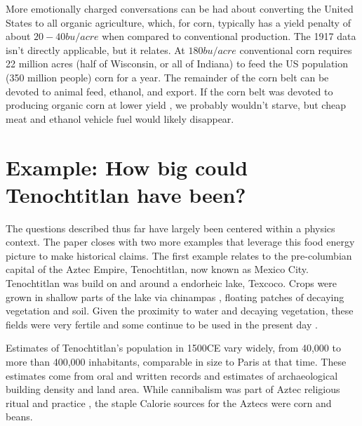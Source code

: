 \documentclass[12pt]{iopart}
\begin{document}
%
%
More emotionally charged conversations can be had about converting the United States to all organic agriculture, which, for corn, typically has a yield penalty of about $20-40bu/acre$ when compared to conventional production.  The 1917 data isn't directly applicable, but it relates. At $180bu/acre$ conventional corn requires 22 million acres (half of Wisconsin, or all of Indiana) to feed the US population (350 million people) corn for a year.  The remainder of the corn belt can be devoted to animal feed, ethanol, and export.  If the corn belt was devoted to producing organic corn at lower yield \cite{organic_corn_yield}, we probably wouldn't starve, but cheap meat and ethanol vehicle fuel would likely disappear.   
%

\section{Example: How big could Tenochtitlan have been?}
The questions described thus far have largely been centered within a physics context.  The paper closes with two more examples that leverage this food energy picture to make historical claims.  The first example relates to the pre-columbian capital of the Aztec Empire, Tenochtitlan, now known as Mexico City.  Tenochtitlan was build on and around a endorheic lake, Texcoco.  Crops were grown in shallow parts of the lake via chinampas \cite{national_geo}, floating patches of decaying vegetation and soil.  Given the proximity to water and decaying vegetation, these fields were very fertile \cite{HortTech_2019,Chinampas_1964} and some continue to be used in the present day \cite{google_earth}.  


Estimates of Tenochtitlan's population in 1500CE vary widely, from 40,000 \cite{40k} to more than 400,000 \cite{400k} inhabitants, comparable in size to Paris at that time. These estimates come from oral and written records and estimates of archaeological building density and land area.   While cannibalism was part of Aztec religious ritual and practice \cite{Aztec_Cannibalism}, the staple Calorie sources for the Aztecs were corn and beans.
\end{document}
